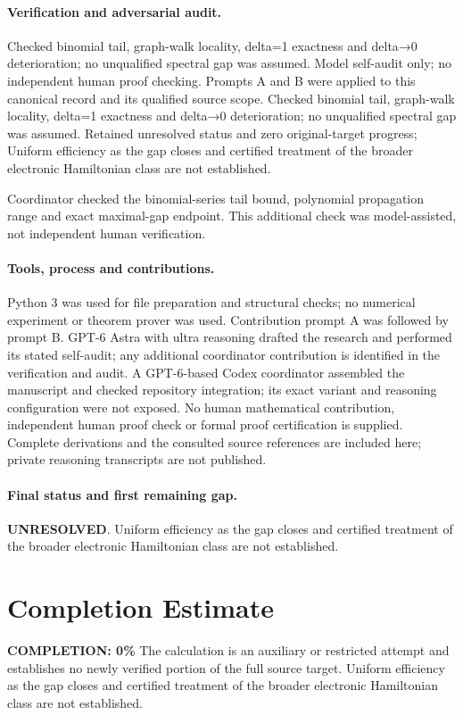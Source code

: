 \documentclass[11pt]{article}
\begin{document}
\paragraph{Verification and adversarial audit.}
Checked binomial tail, graph-walk locality, delta=1 exactness and delta→0 deterioration; no unqualified spectral gap was assumed. Model self-audit only; no independent human proof checking. Prompts A and B were applied to this canonical record and its qualified source scope. Checked binomial tail, graph-walk locality, delta=1 exactness and delta→0 deterioration; no unqualified spectral gap was assumed. Retained unresolved status and zero original-target progress; Uniform efficiency as the gap closes and certified treatment of the broader electronic Hamiltonian class are not established.

Coordinator checked the binomial-series tail bound, polynomial propagation range and exact maximal-gap endpoint. This additional check was model-assisted, not independent human verification.

\paragraph{Tools, process and contributions.}
Python 3 was used for file preparation and structural checks; no numerical experiment or theorem prover was used. Contribution prompt A was followed by prompt B. GPT-6 Astra with ultra reasoning drafted the research and performed its stated self-audit; any additional coordinator contribution is identified in the verification and audit. A GPT-6-based Codex coordinator assembled the manuscript and checked repository integration; its exact variant and reasoning configuration were not exposed. No human mathematical contribution, independent human proof check or formal proof certification is supplied. Complete derivations and the consulted source references are included here; private reasoning transcripts are not published.

\paragraph{Final status and first remaining gap.}
\textbf{UNRESOLVED}. Uniform efficiency as the gap closes and certified treatment of the broader electronic Hamiltonian class are not established.

\section{Completion Estimate}
\noindent\textbf{COMPLETION: 0\%}
The calculation is an auxiliary or restricted attempt and establishes no newly verified portion of the full source target. Uniform efficiency as the gap closes and certified treatment of the broader electronic Hamiltonian class are not established.
\end{document}
